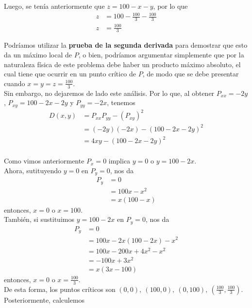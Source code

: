 \documentclass[12pt]{article}
\begin{document}
Luego, se tenía anteriormente que $z=100-x-y$, por lo que
\begin{align*}
  z
  &= 100 - \frac{100}{3} - \frac{100}{3} \\
  z &= \frac{100}{3}
\end{align*}

Podríamos utilizar la \textbf{prueba de la segunda derivada} para demostrar que esto da un máximo local de $P$, o bien, podríamos argumentar simplemente que por la naturaleza física de este problema debe haber un producto máximo absoluto, el cual tiene que ocurrir en un punto crítico de $P$, de modo que se debe presentar cuando $x=y=z=\frac{100}{3}$. \\

Sin embargo, no dejaremos de lado este análisis. Por lo que, al obtener $P_{xx}=-2y$, $P_{xy}=100-2x-2y$ y $P_{yy}=-2x$, tenemos
\begin{align*}
  D(x,y)
  &= P_{xx}P_{yy} - (P_{xy})^2 \\
  &= (-2y)(-2x) - (100-2x-2y)^2\\
  &= 4xy - (100-2x-2y)^2\\
\end{align*}

Como vimos anteriormente $P_x=0$ implica $y=0$ o $y=100-2x$. \\

Ahora, sutituyendo $y=0$ en $P_y=0$, nos da
\begin{align*}
  P_y &= 0 \\
  &= 100x-x^2\\
  &= x(100-x)
\end{align*}
entonces, $x = 0$ o $x=100$. \\

También, si sustituimos $y=100-2x$ en $P_y=0$, nos da
\begin{align*}
  P_y &= 0 \\
  &= 100x-2x(100-2x)-x^2\\
  &= 100x - 200x + 4x^2 - x^2 \\
  &= -100x + 3x^2 \\
  &= x(3x-100)
\end{align*}
entonces, $x = 0$ o $x=\frac{100}{3}$. \\

De esta forma, los puntos críticos son $(0,0),~(100,0),~(0, 100),~\left(\frac{100}{3},\frac{100}{3}\right)$. \\

Posteriormente, calculemos
\end{document}
